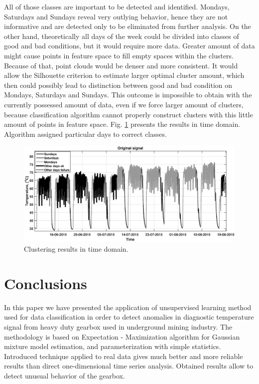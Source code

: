 All of those classes are important to be detected and identified. Mondays, Saturdays and Sundays reveal very outlying behavior, hence they are not informative and are detected only to be eliminated from further analysis. On the other hand, theoretically all days of the week could be divided into classes of good and bad conditions, but it would require more data. Greater amount of data might cause points in feature space to fill empty spaces within the clusters. Because of that, point clouds would be denser and more consistent. It would allow the Silhouette criterion to estimate larger optimal cluster amount, which then could possibly lead to  distinction between good and bad condition on Mondays, Saturdays and Sundays.
This outcome is impossible to obtain with the currently possessed amount of data, even if we force larger amount of clusters, because classification algorithm cannot properly construct clusters with this little amount of points in feature space. Fig. \ref{fig: cplotbw} presents the results in time domain. Algorithm assigned particular days to correct classes.
\begin{figure}[ht!]
\vspace{-10pt}
\centering
\includegraphics[width = \textwidth]{Wykresy/cplotbw.eps}
\caption{Clustering results in time domain.}
\label{fig: cplotbw}
\vspace{-35pt}
\end{figure}
\section{Conclusions}
In this paper we have presented the application of unsupervised learning method used for data classification in order to detect anomalies in diagnostic temperature signal from heavy duty gearbox used in underground mining industry. The methodology is based on Expectation - Maximization algorithm for Gaussian mixture model estimation, and parameterization with simple statistics. Introduced technique applied to real data gives much better and more reliable results than direct one-dimensional time series analysis. Obtained results allow to detect unusual behavior of the gearbox.
\vspace{-15pt}
